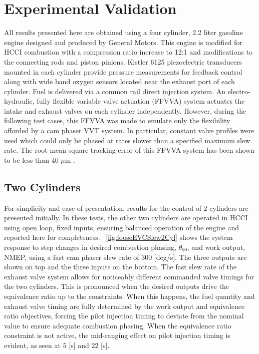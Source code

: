 \section{Experimental Validation} \label{sec:expValidation}
All results presented here are obtained using a four cylinder, 2.2 liter gasoline engine designed and produced by General Motors. This engine is modified for HCCI combustion with a compression ratio increase to 12:1 and modifications to the connecting rods and piston pinions. Kistler 6125 piezoelectric transducers mounted in each cylinder provide pressure measurements for feedback control along with wide band oxygen sensors located near the exhaust port of each cylinder. Fuel is delivered via a common rail direct injection system. An electro-hydraulic, fully flexible variable valve actuation (FFVVA) system actuates the intake and exhaust valves on each cylinder independently. However, during the following test cases, this FFVVA was made to emulate only the flexibility afforded by a cam phaser VVT system. In particular, constant valve profiles were used which could only be phased at rates slower than a specified maximum slew rate. The root mean square tracking error of this FFVVA system has been shown to be less than 40 $\mu$m \cite{Liao2011}.


\subsection{Two Cylinders}
For simplicity and ease of presentation, results for the control of 2 cylinders are presented initially. In these tests, the other two cylinders are operated in HCCI using open loop, fixed inputs, ensuring balanced operation of the engine and reported here for completeness. \figurename~\ref{fig:looseEVCSlew2Cyl} shows the system response to step changes in desired combustion phasing, $\theta_{50}$, and work output, NMEP, using a fast cam phaser slew rate of $300$ [deg/s]. The three outputs are shown on top and the three inputs on the bottom. The fast slew rate of the exhaust valve system allows for noticeably different commanded valve timings for the two cylinders. This is pronounced when the desired outputs drive the equivalence ratio up to the constraints. When this happens, the fuel quantity and exhaust valve timing are fully determined by the work output and equivalence ratio objectives, forcing the pilot injection timing to deviate from the nominal value to ensure adequate combustion phasing. When the equivalence ratio constraint is not active, the mid-ranging effect on pilot injection timing is evident, as seen at $5$ [s] and $22$ [s].


